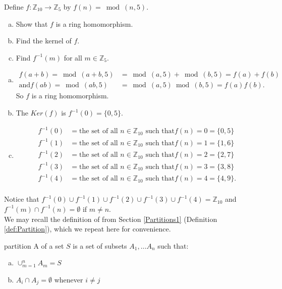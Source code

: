 \begin{example}{}
Define $f: {\mathbb Z}_{10}\rightarrow {\mathbb Z}_5$ by $f(n)=\bmod(n,5)$.
\begin{enumerate}[(a)]
\item Show that $f$ is a ring homomorphism.
\item Find the kernel of $f$.
\item Find $f^{-1}(m)$ for all $m\in{\mathbb Z}_5$.
\end{enumerate}

\begin{enumerate}[(a)]
\item 
\begin{align*}
f(a+b)=\bmod(a+b,5)&=\bmod(a,5)+\bmod(b,5)=f(a)+f(b) \\
\text{and} f(ab)=\bmod(ab,5)&=\bmod(a,5)\bmod(b,5)=f(a)f(b).
\end{align*}
So $f$ is a ring homomorphism.

\item The $Ker(f)$ is $f^{-1}(0)=\{0,5\}$.\\

\item
\begin{align*}
f^{-1}(0)&=\text{the set of all $n\in{\mathbb Z}_{10}$ such that} f(n)=0=\{0,5\} \\
f^{-1}(1)&=\text{the set of all $n\in{\mathbb Z}_{10}$ such that} f(n)=1=\{1,6\} \\
f^{-1}(2)&=\text{the set of all $n\in{\mathbb Z}_{10}$ such that} f(n)=2=\{2,7\} \\
f^{-1}(3)&=\text{the set of all $n\in{\mathbb Z}_{10}$ such that} f(n)=3=\{3,8\} \\
f^{-1}(4)&=\text{the set of all $n\in{\mathbb Z}_{10}$ such that} f(n)=4=\{4,9\}. \\
\end{align*}
\end{enumerate}

Notice that $f^{-1}(0)\cup f^{-1}(1)\cup f^{-1}(2)\cup f^{-1}(3)\cup f^{-1}(4)={\mathbb Z}_{10}$ and $f^{-1}(m)\cap f^{-1}(n)=\emptyset$ if $m\neq n$.\\
We may recall the definition of  from Section \ref{Partitions1} 
(Definition \ref{def:Partition}), which we repeat here for convenience.

\begin{defn}{partition}
A  of a set $S$ is a set of subsets $A_1,\dots A_n$ such that:
\begin{enumerate}[(a)]
\item $\cup_{m=1}^n A_m=S$
\item $A_i\cap A_j=\emptyset$ whenever $i\neq j$
\end{enumerate}
\end{defn}


\end{example}
